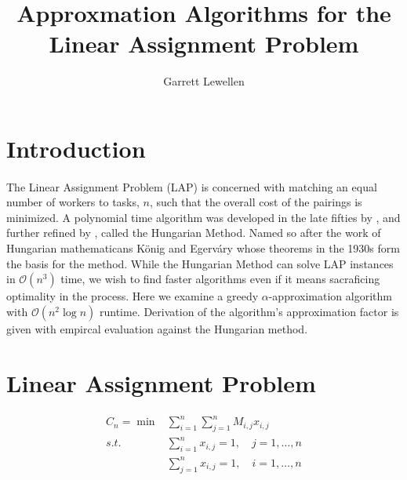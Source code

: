 \documentclass{article}
\newcommand{\boundedBy}[1]{\mathcal{O} \left ( #1 \right )}
\begin{document}
\author{Garrett Lewellen}
\title{Approxmation Algorithms for the Linear Assignment Problem}

\maketitle

\section{Introduction}

\paragraph{} The Linear Assignment Problem (LAP) is concerned with matching an equal number of workers to tasks, $n$, such that the overall cost of the pairings is minimized. A polynomial time algorithm was developed in the late fifties by \cite{kuhn1955hungarian}, and further refined by \cite{munkres1957algorithms}, called the Hungarian Method. Named so after the work of Hungarian mathematicans K{\"o}nig and Egerv{\'a}ry whose theorems in the 1930s form the basis for the method. While the Hungarian Method can solve LAP instances in $\boundedBy{n^3}$ time, we wish to find faster algorithms even if it means sacraficing optimality in the process. Here we examine a greedy $\alpha$-approximation algorithm with $\boundedBy{n^2 \log n}$ runtime. Derivation of the algorithm's approximation factor is given with empircal evaluation against the Hungarian method.

\section{Linear Assignment Problem}

\begin{equation}
\begin{aligned}
	C_n = \min & \sum_{i=1}^{n} \sum_{j=1}^{n} M_{i,j} x_{i,j} \\
	s.t. & \sum_{i=1}^{n} x_{i,j} = 1, \quad j = 1, \ldots, n \\
	& \sum_{j=1}^{n} x_{i,j} = 1, \quad i = 1, \dots, n
	\label{eqn:lap}
\end{aligned}
\end{equation}
\end{document}
